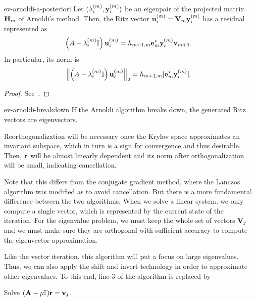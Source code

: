 \begin{Lemma}{ev-arnoldi-a-posteriori}
  Let $(\lambda_i^{(m)},\vy_i^{(m)})$ be an eigenpair of the projected
  matrix $\matH_m$ of Arnoldi's method. Then, the Ritz vector
  $\vu_i^{(m)} = \matv_m \vy_i^{(m)}$ has a residual represented as
  \begin{gather}
    \left(A-\lambda_i^{(m)}\identity\right)\vu_i^{(m)}
    = h_{m+1,m}\ve_m^*\vy_i^{(m)}\vv_{m+1}.
  \end{gather}
  In particular, its norm is
  \begin{gather}
    \norm*{\left(A-\lambda_i^{(m)}\identity\right)\vu_i^{(m)}}_2
    = h_{m+1,m} \abs{\ve_m^*\vy_i^{(m)}}.
  \end{gather}
\end{Lemma}

\begin{proof}
  See~\cite[Proposition 6.8]{Saad11}.
\end{proof}

\begin{Corollary}{ev-arnoldi-breakdown}
  If the Arnoldi algorithm breaks down, the generated Ritz vectors are
  eigenvectors.
\end{Corollary}

\begin{remark}
  Reorthogonalization will be necessary once the Krylov space
  approximates an invariant subspace, which in turn is a sign for
  convergence and thus desirable. Then, $\vr$ will be almost linearly
  dependent and its norm after orthogonalization will be small,
  indicating cancellation.

  Note that this differs from the conjugate gradient method, where the
  Lanczos algorithm was modified as to avoid cancellation. But there
  is a more fundamental difference between the two algorithms. When we
  solve a linear system, we only compute a single vector, which is
  represented by the current state of the iteration. For the
  eigenvalue problem, we must keep the whole set of vectors $\matv_j$
  and we must make sure they are orthogonal with sufficient accuracy
  to compute the eigenvector approximation.
\end{remark}

\begin{remark}
  Like the vector iteration, this algorithm will put a focus on large
  eigenvalues. Thus, we can also apply the shift and invert technology
  in order to approximate other eigenvalues. To this end, line 3 of
  the algorithm is replaced by
  \begin{algorithmic}
    \State Solve $(\mata-\mu\id)\vr = \vv_j$.
  \end{algorithmic}
\end{remark}

